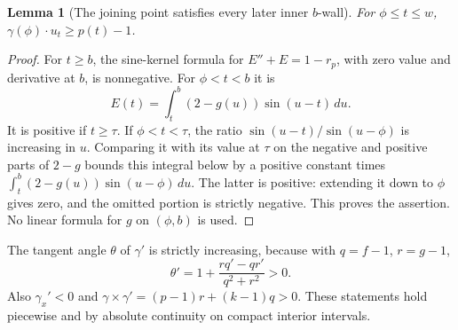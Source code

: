\documentclass[11pt]{article}
\newtheorem{lemma}[theorem]{Lemma}
\begin{document}
\begin{lemma}[The joining point satisfies every later inner $b$-wall]
For $\phi\le t\le w$, $\gamma(\phi)\cdot u_t\ge p(t)-1$.
\end{lemma}
\begin{proof}
For $t\ge b$, the sine-kernel formula for $E''+E=1-r_p$, with zero value and derivative at $b$, is nonnegative. For $\phi<t<b$ it is
\[
 E(t)=\int_t^b(2-g(u))\sin(u-t)\,du.
\]
It is positive if $t\ge\tau$. If $\phi<t<\tau$, the ratio $\sin(u-t)/\sin(u-\phi)$ is increasing in $u$. Comparing it with its value at $\tau$ on the negative and positive parts of $2-g$ bounds this integral below by a positive constant times
$\int_t^b(2-g(u))\sin(u-\phi)\,du$. The latter is positive: extending it down to $\phi$ gives zero, and the omitted portion is strictly negative. This proves the assertion. No linear formula for $g$ on $(\phi,b)$ is used.
\end{proof}

The tangent angle $\theta$ of $\gamma'$ is strictly increasing, because with $q=f-1$, $r=g-1$,
\[
 \theta'=1+\frac{rq'-qr'}{q^2+r^2}>0.
\]
Also $\gamma_x'<0$ and $\gamma\times\gamma'=(p-1)r+(k-1)q>0$. These statements hold piecewise and by absolute continuity on compact interior intervals.
\end{document}
